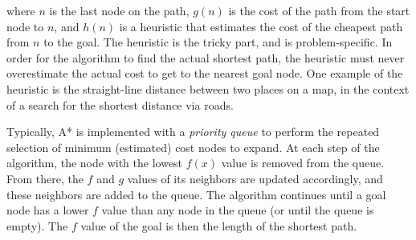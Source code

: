 where $n$ is the last node on the path, $g(n)$ is the cost of the path from the start node to $n$, and $h(n)$ is a heuristic that estimates the cost of the cheapest path from $n$ to the goal. The heuristic is the tricky part, and is problem-specific. In order for the algorithm to find the actual shortest path, the heuristic must never overestimate the actual cost to get to the nearest goal node. One example of the heuristic is the straight-line distance between two places on a map, in the context of a search for the shortest distance via roads. 

Typically, A* is implemented with a \textit{priority queue} to perform the repeated selection of minimum (estimated) cost nodes to expand. At each step of the algorithm, the node with the lowest $f(x)$ value is removed from the queue. From there, the $f$ and $g$ values of its neighbors are updated accordingly, and these neighbors are added to the queue. The algorithm continues until a goal node has a lower $f$ value than any node in the queue (or until the queue is empty). The $f$ value of the goal is then the length of the shortest path. 